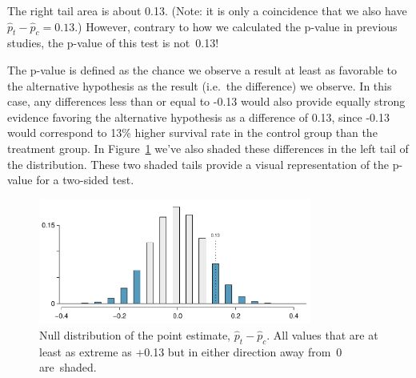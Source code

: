 The right tail area is about 0.13. (Note: it is only a coincidence that we also have $\hat{p}_t - \hat{p}_c=0.13$.) However, contrary to how we calculated the p-value in previous studies, the p-value of this test is not~0.13!

The p-value is defined as the chance we observe a result at least as favorable to the alternative hypothesis as the result (i.e.~the difference) we observe. In this case, any differences less than or equal to -0.13 would also provide equally strong evidence favoring the alternative hypothesis as a difference of 0.13, since -0.13 would correspond to 13\% higher survival rate in the control group than the treatment group. In Figure~\ref{CPR_study_p_value} we've also shaded these differences in the left tail of the distribution. These two shaded tails provide a visual representation of the p-value for a two-sided test.


\begin{figure}[ht]
\centering
\includegraphics[width=0.8\textwidth]{02/figures/CPR_study/CPR_study_p_value}
\caption{Null distribution of the point estimate, $\hat{p}_t - \hat{p}_c$. All values that are at least as extreme as +0.13 but in either direction away from~0 are~shaded.}
\label{CPR_study_p_value}
\end{figure}


